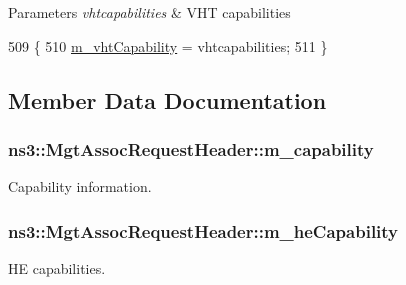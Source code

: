 \begin{DoxyParams}{Parameters}
{\em vhtcapabilities} & V\+HT capabilities \\
\hline
\end{DoxyParams}

\begin{DoxyCode}
509 \{
510   \hyperlink{classns3_1_1MgtAssocRequestHeader_a73ac2a31317dfef487416c10a87d028e}{m\_vhtCapability} = vhtcapabilities;
511 \}
\end{DoxyCode}


\subsection{Member Data Documentation}
\subsubsection[{\texorpdfstring{m\+\_\+capability}{m_capability}}]{ ns3\+::\+Mgt\+Assoc\+Request\+Header\+::m\+\_\+capability\hspace{0.3cm}{\ttfamily [private]}}\hypertarget{classns3_1_1MgtAssocRequestHeader_a601bbf93b52f5ea7c377cce1a995e27d}{}\label{classns3_1_1MgtAssocRequestHeader_a601bbf93b52f5ea7c377cce1a995e27d}


Capability information. 

\subsubsection[{\texorpdfstring{m\+\_\+he\+Capability}{m_heCapability}}]{ ns3\+::\+Mgt\+Assoc\+Request\+Header\+::m\+\_\+he\+Capability\hspace{0.3cm}{\ttfamily [private]}}\hypertarget{classns3_1_1MgtAssocRequestHeader_afe750ae5dbe358b3e863651a67ccd31b}{}\label{classns3_1_1MgtAssocRequestHeader_afe750ae5dbe358b3e863651a67ccd31b}


HE capabilities. 

